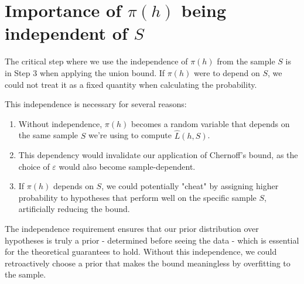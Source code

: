 \documentclass{article}
\begin{document}
\section{Importance of $\pi(h)$ being independent of $S$}

The critical step where we use the independence of $\pi(h)$ from the sample $S$ is in Step 3 when applying the union bound. If $\pi(h)$ were to depend on $S$, we could not treat it as a fixed quantity when calculating the probability.

This independence is necessary for several reasons:

\begin{enumerate}
\item Without independence, $\pi(h)$ becomes a random variable that depends on the same sample $S$ we're using to compute $\hat{L}(h,S)$.
\item This dependency would invalidate our application of Chernoff's bound, as the choice of $\varepsilon$ would also become sample-dependent.
\item If $\pi(h)$ depends on $S$, we could potentially "cheat" by assigning higher probability to hypotheses that perform well on the specific sample $S$, artificially reducing the bound.
\end{enumerate}

The independence requirement ensures that our prior distribution over hypotheses is truly a prior - determined before seeing the data - which is essential for the theoretical guarantees to hold. Without this independence, we could retroactively choose a prior that makes the bound meaningless by overfitting to the sample.
\end{document}
